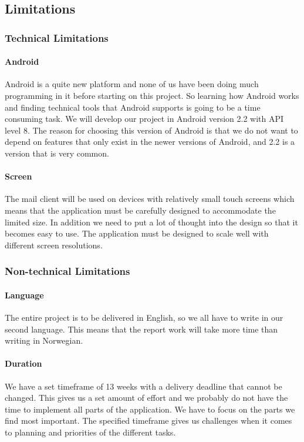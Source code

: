 \subsection{Limitations}

\subsubsection{Technical Limitations}

\paragraph{Android}\hfill
\newline
Android is a quite new platform and none of us have been doing much programming in it before starting on this project. So learning how Android works and finding technical tools that Android supports is going to be a time consuming task. We will develop our project in Android version 2.2 with API level 8. The reason for choosing this version of Android is that we do not want to depend on features that only exist in the newer versions of Android, and 2.2 is a version that is very common.

\paragraph{Screen}\hfill
\newline
The mail client will be used on devices with relatively small touch screens which means that the application must be carefully designed to accommodate the limited size. In addition we need to put a lot of thought into the design so that it becomes easy to use. The application must be designed to scale well with different screen resolutions.

\subsubsection{Non-technical Limitations}

\paragraph{Language}\hfill
\newline
The entire project is to be delivered in English, so we all have to write in our second language. This means that the report work will take more time than writing in Norwegian. 

\paragraph{Duration}\hfill
\newline
We have a set timeframe of 13 weeks with a delivery deadline that cannot be changed. This gives us a set amount of effort and we probably do not have the time to implement all parts of the application. We have to focus on the parts we find most important. The specified timeframe gives us challenges when it comes to planning and priorities of the different tasks.